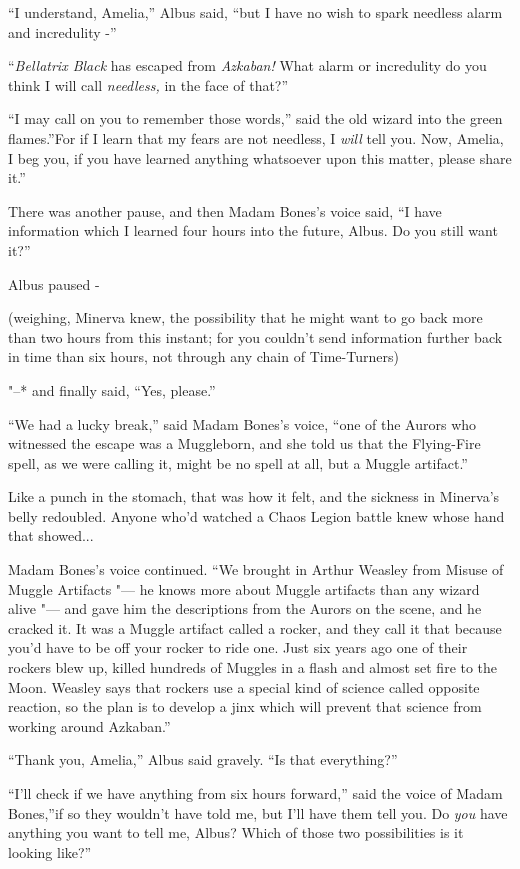 ``I understand, Amelia,'' Albus said, ``but I have no wish to spark
needless alarm and incredulity -''

``\emph{Bellatrix Black} has escaped from \emph{Azkaban!} What alarm or
incredulity do you think I will call \emph{needless,} in the face of
that?''

``I may call on you to remember those words,'' said the old wizard into
the green flames.''For if I learn that my fears are not needless, I
\emph{will} tell you. Now, Amelia, I beg you, if you have learned
anything whatsoever upon this matter, please share it.''

There was another pause, and then Madam Bones's voice said, ``I have
information which I learned four hours into the future, Albus. Do you
still want it?''

Albus paused -

(weighing, Minerva knew, the possibility that he might want to go back
more than two hours from this instant; for you couldn't send information
further back in time than six hours, not through any chain of
Time-Turners)

"--* and finally said, ``Yes, please.''

``We had a lucky break,'' said Madam Bones's voice, ``one of the Aurors
who witnessed the escape was a Muggleborn, and she told us that the
Flying-Fire spell, as we were calling it, might be no spell at all, but
a Muggle artifact.''

Like a punch in the stomach, that was how it felt, and the sickness in
Minerva's belly redoubled. Anyone who'd watched a Chaos Legion battle
knew whose hand that showed...

Madam Bones's voice continued. ``We brought in Arthur Weasley from
Misuse of Muggle Artifacts "--- he knows more about Muggle artifacts than
any wizard alive "--- and gave him the descriptions from the Aurors on the
scene, and he cracked it. It was a Muggle artifact called a rocker, and
they call it that because you'd have to be off your rocker to ride one.
Just six years ago one of their rockers blew up, killed hundreds of
Muggles in a flash and almost set fire to the Moon. Weasley says that
rockers use a special kind of science called opposite reaction, so the
plan is to develop a jinx which will prevent that science from working
around Azkaban.''

``Thank you, Amelia,'' Albus said gravely. ``Is that everything?''

``I'll check if we have anything from six hours forward,'' said the
voice of Madam Bones,''if so they wouldn't have told me, but I'll have
them tell you. Do \emph{you} have anything you want to tell me, Albus?
Which of those two possibilities is it looking like?''

